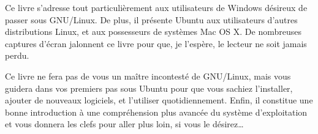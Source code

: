 Ce livre s'adresse tout particulièrement aux utilisateurs de Windows désireux de passer sous GNU/Linux. De plus, il présente Ubuntu aux utilisateurs d'autres distributions Linux, et aux possesseurs de systèmes Mac OS X. De nombreuses captures d'écran jalonnent ce livre pour que, je l'espère, le lecteur ne soit jamais perdu.\par
Ce livre ne fera pas de vous un maître incontesté de GNU/Linux, mais vous guidera dans vos premiers pas sous Ubuntu pour que vous sachiez l'installer, ajouter de nouveaux logiciels, et l'utiliser quotidiennement. Enfin, il constitue une bonne introduction à une compréhension plus avancée du système d'exploitation et vous donnera les clefs pour aller plus loin, si vous le désirez\ldots{}\par
